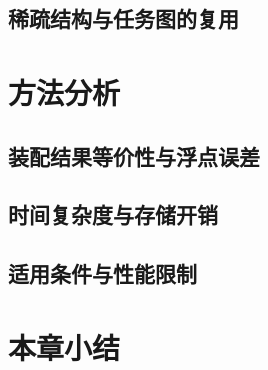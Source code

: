 \subsection{稀疏结构与任务图的复用}
\thesisdraftnote

\section{方法分析}
\subsection{装配结果等价性与浮点误差}
\thesisdraftnote

\subsection{时间复杂度与存储开销}
\thesisdraftnote

\subsection{适用条件与性能限制}
\thesisdraftnote

\section{本章小结}
\thesisdraftnote

